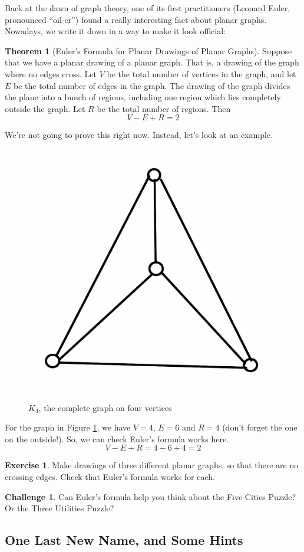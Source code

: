 \documentclass[12pt,letterpaper]{article}
\theoremstyle{definition}
\newtheorem{exercise}[question]{Exercise}
\newtheorem*{challenge}{Challenge}
\newtheorem*{theorem}{Theorem}
\begin{document}
Back at the dawn of graph theory, one of its first practitioners (Leonard Euler, pronounced ``oil-er'')
found a really interesting fact about planar graphs. Nowadays, we write it down in a way to make it look
official:

\begin{theorem}[Euler's Formula for Planar Drawings of Planar Graphs] Suppose that we have a planar 
drawing of a planar graph. That is, a drawing of the graph where no edges cross. Let $V$ be the total number 
of vertices in the graph, and let $E$ be the total number of edges in the graph. The drawing of the graph 
divides the plane into a bunch of regions, including one region which lies completely outside the graph. 
Let $R$ be the total number of regions. Then
\[
V-E+R = 2
\]
\end{theorem}

We're not going to prove this right now. Instead, let's look at an example.

\begin{figure}[h!]
\centering
\includegraphics[width=.3\textwidth]{images/std_k4.png}
\caption{$K_4$, the complete graph on four vertices}
\label{figure:stdk4}
\end{figure}

For the graph in Figure \ref{figure:stdk4}, we have $V=4$, $E=6$ and $R=4$ (don't forget the one on the outside!). So, we can check Euler's formula works here.
\[
V - E + R = 4 - 6 + 4 = 2
\]

\begin{exercise}
Make drawings of three different planar graphs, so that there are no crossing edges. Check that
Euler's formula works for each.
\end{exercise}

\begin{challenge}
Can Euler's formula help you think about the Five Cities Puzzle? Or the Three Utilities Puzzle?
\end{challenge}

\subsection*{One Last New Name, and Some Hints}
\end{document}
